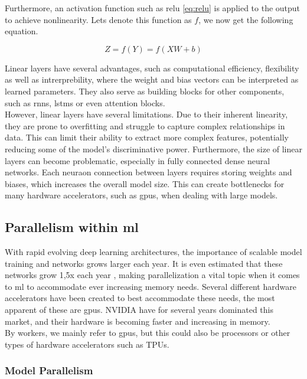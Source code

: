 Furthermore, an activation function such as \gls{relu} \ref{eq:relu} is applied to the output to achieve nonlinearity.
Lets denote this function as $f$, we now get the following equation.

\begin{equation}
    Z = f(Y) = f(XW+b)
\end{equation}

Linear layers have several advantages, such as computational efficiency, flexibility as well as intrerprebility, where the weight and bias vectors can be interpreted as learned parameters. They also serve as building blocks for other components, such as \acrshort{rnn}s, \acrshort{lstm}s or even attention blocks. \\ 

However, linear layers have several limitations. Due to their inherent linearity, they are prone to overfitting and struggle to capture complex relationships in data. This can limit their ability to extract more complex features, potentially reducing some of the model's discriminative power. Furthermore, the size of linear layers can become problematic, especially in fully connected dense neural networks. Each neuraon connection between layers requires storing weights and biases, which increases the overall model size. This can create bottlenecks for many hardware accelerators, such as \acrshort{gpu}s, when dealing with large models.

\subsection{Parallelism within \acrlong{ml}}

With rapid evolving deep learning architectures, the importance of scalable model training and networks grows larger each year. It is even estimated that these networks grow 1,5x each year \cite{9499913}, making parallelization a vital topic when it comes to \acrlong{ml} to accommodate ever increasing memory needs. Several different hardware accelerators have been created to best accommodate these needs, the most apparent of these are \acrshort{gpu}s. NVIDIA have for several years dominated this market, and their hardware is becoming faster and increasing in memory. \\

By workers, we mainly refer to \acrshort{gpu}s, but this could also be processors or other types of hardware accelerators such as TPUs.


\subsubsection{Model Parallelism}

